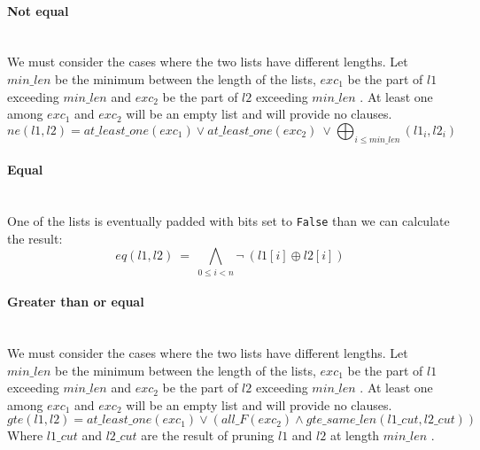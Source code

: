   \paragraph*{Not equal} \hfill \\
  We must consider the cases where the two lists have different lengths.
  Let \(min\_len\)  be the minimum between the length of the lists, \(exc_1\)  be the part of \(l1\) 
  exceeding \(min\_len\)  and \(exc_2\)  be the part of \(l2\)  exceeding \(min\_len\) . At least one 
  among \(exc_1\)  and \(exc_2\)  will be an empty list and will provide no clauses.\\
  \begin{equation}
    ne(l1, l2) = at\_least\_one(exc_1) \lor at\_least\_one(exc_2)\ \lor \bigoplus_{i \leq min\_len}(l1_i, l2_i)
  \end{equation}

  \paragraph*{Equal} \hfill \\
    One of the lists is eventually padded with bits set to \texttt{False} than we can
    calculate the result:
    \begin{equation}
      eq(l1, l2)\ =\ \bigwedge_{0 \leq i < n} \neg\ (l1[i] \oplus l2[i])
    \end{equation}

  \paragraph*{Greater than or equal} \hfill \\
    We must consider the cases where the two lists have different lengths.
    Let \(min\_len\)  be the minimum between the length of the lists, \(exc_1\)  be the part of \(l1\)  
    exceeding \(min\_len\)  and \(exc_2\)  be the part of \(l2\)  exceeding \(min\_len\) . At least one among
    \(exc_1\)  and \(exc_2\)  will be an empty list and will provide no clauses.\\
    \begin{equation}
          gte(l1, l2) = at\_least\_one(exc_1) \lor ( all\_F(exc_2) \land gte\_same\_len(l1\_cut, l2\_cut))
    \end{equation}
    Where \(l1\_cut\)  and \(l2\_cut\)  are the result of pruning \(l1\)  and \(l2\)  at length \(min\_len\) .\\

